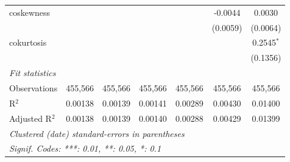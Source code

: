 \begin{table}[H]
\begin{tabular}{lcccccc}
      coskewness     &          &          &          &          & -0.0044      & 0.0030\\   
                     &          &          &          &          & (0.0059)     & (0.0064)\\   
      cokurtosis     &          &          &          &          &              & 0.2545$^{*}$\\   
                     &          &          &          &          &              & (0.1356)\\   
      \midrule
      \emph{Fit statistics}\\
      Observations   & 455,566  & 455,566  & 455,566  & 455,566  & 455,566      & 455,566\\  
      R$^2$          & 0.00138  & 0.00139  & 0.00141  & 0.00289  & 0.00430      & 0.01400\\  
      Adjusted R$^2$ & 0.00138  & 0.00139  & 0.00140  & 0.00288  & 0.00429      & 0.01399\\  
      \midrule \midrule
      \multicolumn{7}{l}{\emph{Clustered (date) standard-errors in parentheses}}\\
      \multicolumn{7}{l}{\emph{Signif. Codes: ***: 0.01, **: 0.05, *: 0.1}}\\
   \end{tabular}
\end{table}
